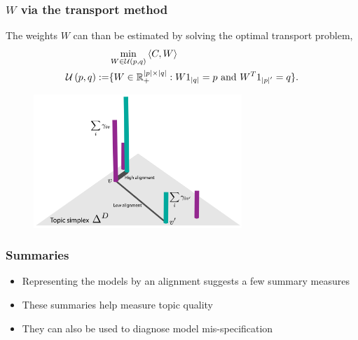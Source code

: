 \documentclass[hyperref={colorlinks=true, linkcolor=violet, citecolor=SeaGreen}]{beamer}
\begin{document}
\begin{frame}
\frametitle{$W$ via the transport method}
The weights $W$ can than be estimated by solving the optimal transport problem,
\begin{align*}
&\min_{W \in \mathcal{U}\left(p, q\right)} \left<C,W\right> \\
\mathcal{U}\left(p, q\right) := &\{W\in \mathbb{R}^{\left|p\right| \times \left|q\right|}_{+} : W 1_{\left|q\right|} = p \text{ and } W^{T} 1_{\left|p\right|^\prime} = q\}.
\end{align*}
\begin{figure}
\includegraphics[width=0.7\textwidth]{transport_alignment}
\end{figure}
\end{frame}

\begin{frame}
  \frametitle{Summaries}
  \begin{itemize}
    \item Representing the models by an alignment suggests a few summary measures
    \item These summaries help measure topic quality
    \item They can also be used to diagnose model mis-specification
  \end{itemize}
\end{frame}
\end{document}
